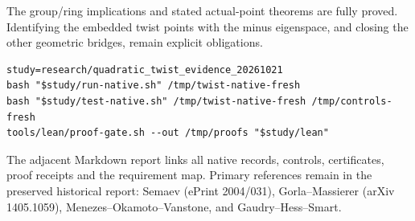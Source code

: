 \documentclass[10pt]{article}
\begin{document}
The group/ring implications and stated actual-point theorems are fully proved.
Identifying the embedded twist points with the minus eigenspace, and closing
the other geometric bridges, remain explicit obligations.

\begin{verbatim}
study=research/quadratic_twist_evidence_20261021
bash "$study/run-native.sh" /tmp/twist-native-fresh
bash "$study/test-native.sh" /tmp/twist-native-fresh /tmp/controls-fresh
tools/lean/proof-gate.sh --out /tmp/proofs "$study/lean"
\end{verbatim}
The adjacent Markdown report links all native records, controls, certificates,
proof receipts and the requirement map. Primary references remain in the
preserved historical report: Semaev (ePrint 2004/031), Gorla--Massierer
(arXiv 1405.1059), Menezes--Okamoto--Vanstone, and Gaudry--Hess--Smart.
\end{document}
